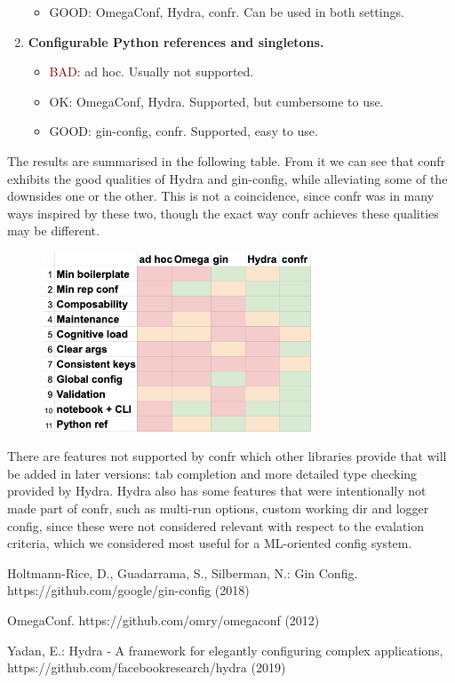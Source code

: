 \documentclass{itatnew}
\begin{document}
\begin{enumerate}
\begin{itemize}
            \item \textcolor{OliveGreen}{GOOD}: OmegaConf, Hydra, confr. Can be used in both settings.
        \end{itemize}
    \item \textbf{Configurable Python references and singletons.}
        \begin{itemize}
            \item \textcolor{Maroon}{BAD}: ad hoc. Usually not supported.
            \item \textcolor{YellowOrange}{OK}: OmegaConf, Hydra. Supported, but cumbersome to use.
            \item \textcolor{OliveGreen}{GOOD}: gin-config, confr. Supported, easy to use.
        \end{itemize}
\end{enumerate}


The results are summarised in the following table.
From it we can see that confr exhibits the good qualities of Hydra and gin-config, while alleviating some of the downsides one or the other.
This is not a coincidence, since confr was in many ways inspired by these two, though the exact way confr achieves these qualities may be different.

\begin{figure}[H]
    \centering
    \includegraphics[width=8cm]{eval.png}
\end{figure}

There are features not supported by confr which other libraries provide that will be added in later versions: tab completion and more detailed type checking provided by Hydra. Hydra also has some features that were intentionally not made part of confr, such as multi-run options, custom working dir and logger config, since these were not considered relevant with respect to the evalation criteria, which we considered most useful for a ML-oriented config system.


\begin{thebibliography}{5}

Holtmann-Rice, D., Guadarrama, S., Silberman, N.:
Gin Config.
https://github.com/google/gin-config (2018)

OmegaConf.
https://github.com/omry/omegaconf (2012)

Yadan, E.:
Hydra - A framework for elegantly configuring complex applications,
https://github.com/facebookresearch/hydra (2019)

\end{thebibliography}
\end{document}

